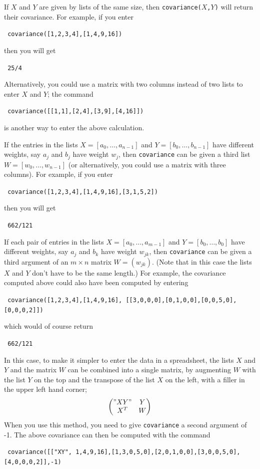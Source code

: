 \documentclass[a4paper,11pt]{book}
\begin{document}
If $X$ and $Y$ are given by lists of the same size, then
\texttt{covariance($X$,$Y$)} will return their covariance.  For example,
if you enter
\begin{center}
  \tt
  covariance([1,2,3,4],[1,4,9,16])
\end{center}
then you will get
\begin{center}
  \tt
  25/4
\end{center}
Alternatively, you could use a matrix with two columns instead of two
lists to enter $X$ and $Y$; the command
\begin{center}
  \tt
  covariance([[1,1],[2,4],[3,9],[4,16]])
\end{center}
is another way to enter the above calculation.

If the entries in the lists $X=[a_0,\dots,a_{n-1}]$ and
$Y=[b_0,\dots,b_{n-1}]$ have different weights, say $a_j$ and $b_j$ have
weight $w_j$, then \texttt{covariance} can be given a third list
$W=[w_0,\dots,w_{n-1}]$ (or alternatively, you could use a matrix with
three columns).  For example, if you enter
\begin{center}
  \tt
  covariance([1,2,3,4],[1,4,9,16],[3,1,5,2])
\end{center}
then you will get
\begin{center}
  \tt
  662/121
\end{center}

If each pair of entries in the lists $X=[a_0,\dots,a_{m-1}]$ and
$Y=[b_0,\dots,b_{0}]$ have different weights, say $a_j$ and $b_k$ have
weight $w_{jk}$, then \texttt{covariance} can be given a third
argument of an $m\times n$ matrix $W=(w_{jk})$.  (Note that in this
case the lists $X$ and $Y$ don't have to be the same length.)  For
example, the covariance computed above could also have been computed
by entering
\begin{center}
  \tt
  covariance([1,2,3,4],[1,4,9,16],
             [[3,0,0,0],[0,1,0,0],[0,0,5,0],[0,0,0,2]])
\end{center}
which would of course return
\begin{center}
  \tt
  662/121
\end{center}
In this case, to make it simpler to enter the data in a spreadsheet,
the lists $X$ and $Y$ and the matrix $W$ can be combined into a single
matrix, by augmenting $W$ with the list $Y$ on the top and the
transpose of the list $X$ on the left, with a filler in the upper left
hand corner;
\[
\begin{pmatrix}
"XY"  & Y\\
X^T    & W
\end{pmatrix}
\]
When you use this method, you need to give \texttt{covariance} a
second argument of -1.  The above covariance can then be computed with
the command 
\begin{center}
  \tt
  covariance([["XY", 1,4,9,16],[1,3,0,5,0],[2,0,1,0,0],[3,0,0,5,0],[4,0,0,0,2]],-1)
\end{center}
\end{document}
